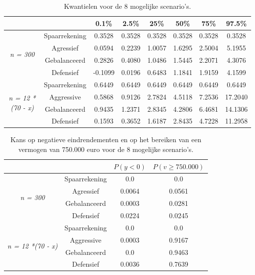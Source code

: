 \begin{table}[h]
\centering
\begin{tabular}{cc|cccccc}
\multicolumn{1}{l}{}                       &               & 0.1\%     & 2.5\%     & 25\%      & 50\%      & 75\%      & 97.5\%    \\ \hline
\multirow{4}{*}{\textit{n = 300}}          & Spaarrekening & 0.3528 & 0.3528 & 0.3528 & 0.3528 & 0.3528 & 0.3528 \\
                                           & Agressief    & 0.0594 & 0.2239 & 1.0057 & 1.6295 & 2.5004 & 5.1955 \\
                                           & Gebalanceerd  & 0.2826 & 0.4080 & 1.0486 & 1.5445 & 2.2071 & 4.3076 \\
                                           & Defensief     & -0.1099 & 0.0196 & 0.6483 & 1.1841 & 1.9159 & 4.1599 \\ \hline
\multirow{4}{*}{\textit{n = 12 *(70 - x)}} & Spaarrekening & 0.6449 & 0.6449 & 0.6449 & 0.6449 & 0.6449 & 0.6449\\
                                           & Aggressive    & 0.5868 & 0.9126 & 2.7824 & 4.5118 & 7.2536 & 17.2040 \\
                                           & Gebalanceerd  & 0.9435 & 1.2371 & 2.8345 & 4.2806 & 6.4681 &14.1306 \\
                                           & Defensief     & 0.1593 & 0.3652 & 1.6187 & 2.8435 & 4.7228 & 11.2958
\end{tabular}
\caption{Kwantielen voor de 8 mogelijke scenario's.}
\label{tab:op12a}
\end{table}

\begin{table}[h]
\centering
\begin{tabular}{cc|c|c}
\multicolumn{1}{l}{}                       &               & $P(y<0)$     & $P(v\geq 750.000)$      \\ \hline
\multirow{4}{*}{\textit{n = 300}}          & Spaarrekening & 0.0 & 0.0  \\
                                           & Agressief    & 0.0064 & 0.0561 \\
                                           & Gebalanceerd  & 0.0003 & 0.0281 \\
                                           & Defensief     & 0.0224& 0.0245 \\ \hline
\multirow{4}{*}{\textit{n = 12 *(70 - x)}} & Spaarrekening & 0.0 & 0.0  \\
                                           & Aggressive    & 0.0003 & 0.9167  \\
                                           & Gebalanceerd  & 0.0 & 0.9463 \\
                                           & Defensief     & 0.0036 & 0.7639 
\end{tabular}
\caption{Kans op negatieve eindrendementen en op het bereiken van een vermogen van 750.000 euro voor de 8 mogelijke scenario's.}
\label{tab:op12b}
\end{table}
